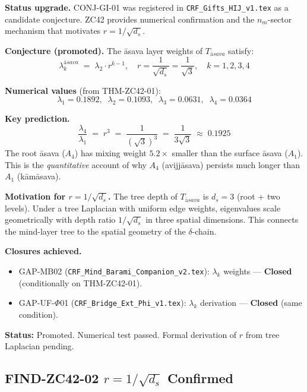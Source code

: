 \documentclass[12pt, a4paper]{article}
\providecommand{\ltwo}{\lambda_2}
\providecommand{\nm}{n_m}
\providecommand{\ds}{d_s}
\providecommand{\lkas}{\lambda_k^{\bar{\mathrm{a}}sava}}
\providecommand{\Tasava}{T_{\bar{\mathrm{a}}sava}}
\providecommand{\Tasava}{\mathcal{T}_{\!\mathrm{\bar{a}sava}}}
\begin{document}
\begin{formalbox}[title={CONJ-GI-01 (Promoted from
  Session Conjecture): $\lkas = \ltwo\cdot r^{k-1}$}]
\textbf{Status upgrade.}
CONJ-GI-01 was registered in \texttt{CRF\_Gifts\_HIJ\_v1.tex}
as a candidate conjecture. ZC42 provides numerical confirmation
and the $\nm$-sector mechanism that motivates $r = 1/\sqrt{\ds}$.

\textbf{Conjecture (promoted).}
The \={a}sava layer weights of $\Tasava$ satisfy:
\[
  \lkas \;=\; \ltwo \cdot r^{k-1},
  \quad r = \frac{1}{\sqrt{\ds}} = \frac{1}{\sqrt{3}},
  \quad k = 1, 2, 3, 4
\]

\textbf{Numerical values} (from THM-ZC42-01):
\[
  \lambda_1 = 0.1892,\;\;
  \lambda_2 = 0.1093,\;\;
  \lambda_3 = 0.0631,\;\;
  \lambda_4 = 0.0364
\]

\textbf{Key prediction.}
\[
  \frac{\lambda_4}{\lambda_1} \;=\; r^3
  \;=\; \frac{1}{(\sqrt{3})^3} \;=\; \frac{1}{3\sqrt{3}}
  \;\approx\; 0.1925
\]
The root \={a}sava ($A_4$) has mixing weight $5.2\times$
smaller than the surface \={a}sava ($A_1$).
This is the \emph{quantitative} account of why
$A_4$ (avijj\={a}sava) persists much longer than $A_1$
(k\={a}m\={a}sava).

\textbf{Motivation for $r = 1/\sqrt{\ds}$.}
The tree depth of $\Tasava$ is $\ds = 3$ (root + two levels).
Under a tree Laplacian with uniform edge weights, eigenvalues
scale geometrically with depth ratio $1/\sqrt{\ds}$ in three
spatial dimensions. This connects the mind-layer tree to
the spatial geometry of the $\delta$-chain.

\textbf{Closures achieved.}
\begin{itemize}[leftmargin=*, noitemsep]
\item GAP-MB02 (\texttt{CRF\_Mind\_Barami\_Companion\_v2.tex}):
  $\lambda_k$ weights --- \textbf{Closed} (conditionally on THM-ZC42-01).
\item GAP-UF-$\Phi$01 (\texttt{CRF\_Bridge\_Ext\_Phi\_v1.tex}):
  $\lambda_k$ derivation --- \textbf{Closed} (same condition).
\end{itemize}

\textbf{Status:} Promoted. Numerical test passed.
Formal derivation of $r$ from tree Laplacian pending.
\end{formalbox}

\subsection{FIND-ZC42-02 \quad \texorpdfstring{$r = 1/\sqrt{d_s}$}{r = 1/ds} Confirmed}
\end{document}
